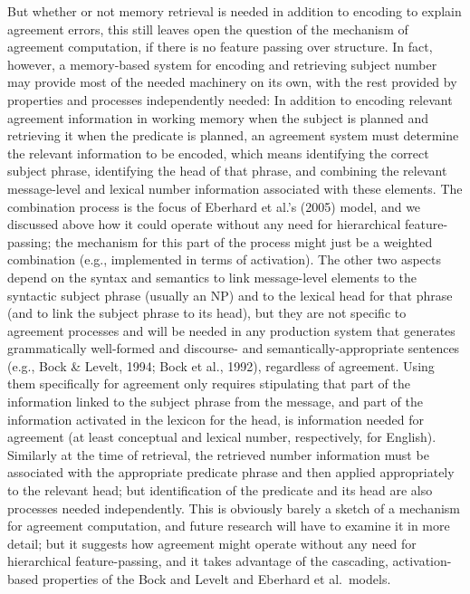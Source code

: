 \documentclass[12pt,titlepage]{article}
\begin{document}
But whether or not memory retrieval is needed in addition to encoding to
explain agreement errors, this still leaves open the question of the
mechanism of agreement computation, if there is no feature passing over
structure.  In fact, however, a memory-based system for encoding and
retrieving subject number may provide most of the needed machinery on its
own, with the rest provided by properties and processes independently
needed: In addition to encoding relevant agreement information in working
memory when the subject is planned and retrieving it when the predicate is
planned, an agreement system must determine the relevant information to be
encoded, which means identifying the correct subject phrase, identifying
the head of that phrase, and combining the relevant message-level and
lexical number information associated with these elements.  The combination
process is the focus of Eberhard et al.'s (2005) model, and we discussed
above how it could operate without any need for hierarchical
feature-passing; the mechanism for this part of the process might just be a
weighted combination (e.g., implemented in terms of activation).  The other
two aspects depend on the syntax and semantics to link message-level
elements to the syntactic subject phrase (usually an NP) and to the lexical
head for that phrase (and to link the subject phrase to its head), but they
are not specific to agreement processes and will be needed in any
production system that generates grammatically well-formed and discourse-
and semantically-appropriate sentences (e.g., Bock \& Levelt, 1994; Bock et
al., 1992), regardless of agreement.  Using them specifically for agreement
only requires stipulating that part of the information linked to the
subject phrase from the message, and part of the information activated in
the lexicon for the head, is information needed for agreement (at least
conceptual and lexical number, respectively, for English).  Similarly at
the time of retrieval, the retrieved number information must be associated
with the appropriate predicate phrase and then applied appropriately to the
relevant head; but identification of the predicate and its head are also
processes needed independently.  This is obviously barely a sketch of a
mechanism for agreement computation, and future research will have to
examine it in more detail; but it suggests how agreement might operate
without any need for hierarchical feature-passing, and it takes advantage
of the cascading, activation-based properties of the Bock and Levelt and
Eberhard et al.\ models.
\end{document}
